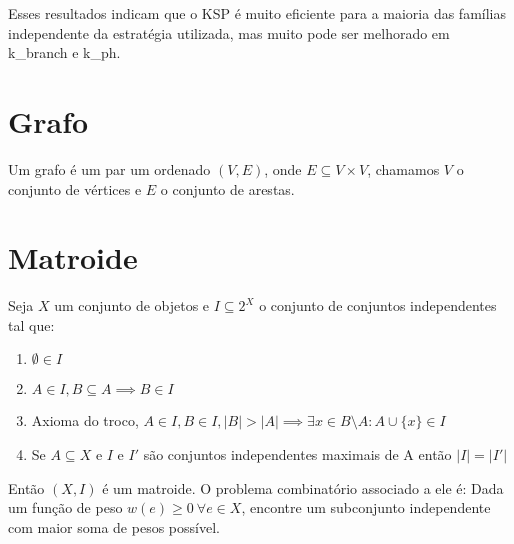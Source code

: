 Esses resultados indicam que o KSP é muito eficiente para a maioria das famílias independente da estratégia utilizada, mas muito pode ser melhorado em k\_branch e k\_ph.

\section{Grafo}
Um grafo é um par um ordenado $(V, E)$, onde $E \subseteq V\times V$, chamamos $V$ o conjunto de vértices e $E$ o conjunto de arestas.

\section{Matroide}
Seja $X$ um conjunto de objetos e $I \subseteq 2^X$ o conjunto de conjuntos independentes tal que:
\begin{enumerate}
	\item $\emptyset \in I$
	\item $A \in I, B \subseteq A \implies B \in I$
	\item Axioma do troco, $A \in I, B \in I, |B| > |A| \implies \exists x \in B \setminus A : A \cup \{x\} \in I$
	\item Se $A \subseteq X$ e $I$ e $I'$ são conjuntos independentes maximais de A então $|I| = |I'|$
\end{enumerate}
Então $(X, I)$ é um matroide. O problema combinatório associado a ele é: Dada um função de peso $w(e) \geq 0 ~\forall e \in X$, encontre um subconjunto independente com maior soma de pesos possível.
